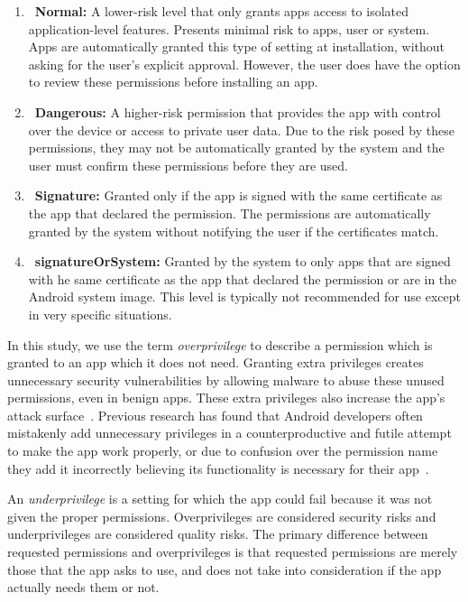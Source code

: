 \documentclass{sig-alternate}
\begin{document}
\begin{enumerate}
  \item~\textbf{Normal:} A lower-risk level that only grants apps access to isolated application-level features. Presents minimal risk to apps, user or system. Apps are automatically granted this type of setting at installation, without asking for the user's explicit approval. However, the user does have the option to review these permissions before installing an app.
  \item~\textbf{Dangerous:} A higher-risk permission that provides the app with control over the device or access to private user data. Due to the risk posed by these permissions, they may not be automatically granted by the system and the user must confirm these permissions before they are used.
  \item~\textbf{Signature:} Granted only if the app is signed with the same certificate as the app that declared the permission. The permissions are automatically granted by the system without notifying the user if the certificates match.
  \item~\textbf{signatureOrSystem:} Granted by the system to only apps that are signed with he same certificate as the app that declared the permission or are in the Android system image. This level is typically not recommended for use except in very specific situations.
\end{enumerate}

In this study, we use the term \emph{overprivilege} to describe a permission which is granted to an app which it does not need. Granting extra privileges creates unnecessary security vulnerabilities by allowing malware to abuse these unused permissions, even in benign apps. These extra privileges also increase the app's attack surface~\cite{Davi:2010:PEA:1949317.1949356, Bartel:2012:ASP:2351676.2351722}. Previous research has found that Android developers often mistakenly add unnecessary privileges in a counterproductive and futile attempt to make the app work properly, or due to confusion over the permission name they add it incorrectly believing its functionality is necessary for their app~\cite{Felt:2011:APD:2046707.2046779}.

An \emph{underprivilege} is a setting for which the app could fail because it was not given the proper permissions. Overprivileges are considered security risks and underprivileges are considered quality risks. The primary difference between requested permissions and overprivileges is that requested permissions are merely those that the app asks to use, and does not take into consideration if the app actually needs them or not.
\end{document}

